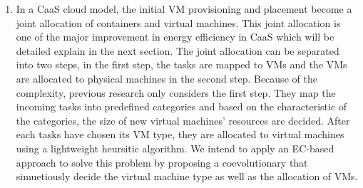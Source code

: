 \begin{enumerate}
	\item In a CaaS cloud model, the initial VM provisioning and placement become a joint allocation of containers and virtual machines. This joint allocation is one of the major improvement in energy efficiency in CaaS which will be detailed explain in the next section.
	The joint allocation can be separated into two steps, in the first step, the tasks are mapped to VMs 
	and the VMs are allocated to physical machines in the second step. Because of the complexity, previous research
	only considers the first step. They map the incoming tasks into predefined categories and based on the characteristic of the categories, the size of new virtual machines' resources are decided. After each tasks have chosen its VM type, they are allocated to virtual machines using a lightweight heursitic algorithm. 
	We intend to apply an EC-based approach to solve this problem by proposing a coevolutionary that simuetiously decide the virtual machine type as well as the allocation of VMs.



\end{enumerate}
